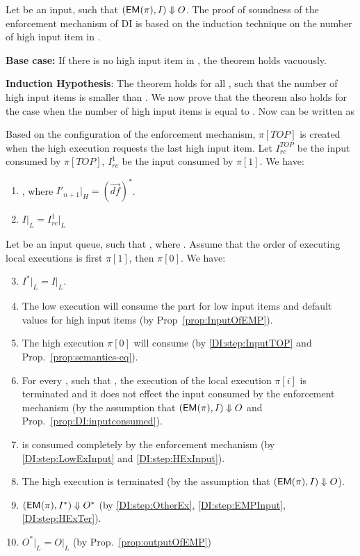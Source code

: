 \documentclass[10pt,a4paper,oneside]{article}
\def\execution#1#2#3{\ensuremath{(#1, #2)\Downarrow#3}}
\def\defseq#1{\ensuremath{#1 = (\defvec)^*}}
\def\loweq#1#2{\ensuremath{\restrict{#1}{L} = \restrict{#2}{L}}}
\def\Irc#1{\ensuremath{I_{rc}^{#1}}}
\def\restrict#1#2{\ensuremath{{#1}|_{#2}}}
\def\TOP{\ensuremath{TOP}}
\def\sanserif#1{\ensuremath{\sf #1}}
\def\defvec{\ensuremath{\vec{df}}}
\def\EM{\ensuremath{{\sanserif{EM}}}}
\def\Prog{\ensuremath{\pi}}
\def\Progl#1{\ensuremath{\Prog[#1]}}
\def\EMP{\ensuremath{\EM(}\ensuremath{\Prog)}}
\begin{document}
Let  be an input, such that \execution{\EMP}{I}{O}. The proof of soundness of the enforcement mechanism of DI is based on the induction technique on the number of high input item in .

\textbf{Base case:} If there is no high input item in , the theorem holds vacuously.

\textbf{Induction Hypothesis}: The theorem holds for all , such that the number of high input items is smaller than . We now prove that the theorem also holds for the case when the number of high input items is equal to . Now  can be written as 



Based on the configuration of the enforcement mechanism, \Progl{TOP} is created when the high execution requests the last high input item. Let \Irc{\TOP} be the input consumed by \Progl{TOP}, \Irc{1} be the input consumed by \Progl{1}. We have:
\begin{enumerate}
\item , where \defseq{I'_{n+1}|_H}. \label{DI:step:InputTOP}

\item \loweq{I}{\Irc{1}} \label{DI:step:InputLow}
\end{enumerate}

Let  be an input queue, such that , where . Assume that the order of executing local executions is first \Progl{1}, then \Progl{0}. We have:
\begin{enumerate}
\setcounter{enumi}{2}
\item \loweq{I^*}{I}. \label{DI:step:lowEqInput}

\item The low execution will consume the part  for low input items and default values for high input items (by Prop~\ref{prop:InputOfEMP}). \label{DI:step:LowExInput}

\item \label{DI:step:HExInput} The high execution \Progl{0} will consume  (by \ref{DI:step:InputTOP} and Prop.~\ref{prop:semantics-eq}).

\item For every , such that  , the execution of the local execution \Progl{i} is terminated and it does not effect the input consumed by the enforcement mechanism (by the assumption that \execution{\EMP}{I}{O} and Prop.~\ref{prop:DI:inputconsumed}). \label{DI:step:OtherEx}

\item  is consumed completely by the enforcement mechanism (by \ref{DI:step:LowExInput} and \ref{DI:step:HExInput}). \label{DI:step:EMPInput}


\item The high execution is terminated (by the assumption that \execution{\EMP}{I}{O}). \label{DI:step:HExTer}


\item \execution{\EMP}{I^*}{O^*} (by \ref{DI:step:OtherEx}, \ref{DI:step:EMPInput}, \ref{DI:step:HExTer}). \label{DI:step:EMPTer}

\item \loweq{O^*}{O} (by Prop.~\ref{prop:outputOfEMP}) \label{DI:step:EMPOut}
\end{enumerate}
\end{document}
